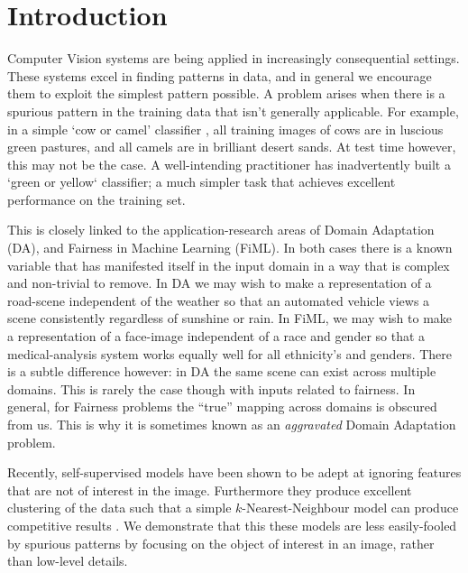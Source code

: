 \documentclass[sigconf,anonymous,review]{acmart}
\begin{document}
\maketitle





\section{Introduction}
\label{sec:intro}
Computer Vision systems are being applied in increasingly consequential settings.
These systems excel in finding patterns in data, and in general we encourage them to exploit the simplest pattern possible.
A problem arises when there is a spurious pattern in the training data that isn't generally applicable.
For example, in a simple `cow or camel' classifier \citep{beery2018recognition}, all training images of cows are in luscious green pastures, and all camels are in brilliant desert sands.
At test time however, this may not be the case. 
A well-intending practitioner has inadvertently built a `green or yellow` classifier; a much simpler task that achieves excellent performance on the training set.

This is closely linked to the application-research areas of Domain Adaptation (DA), and Fairness in Machine Learning (FiML). 
In both cases there is a known variable that has manifested itself in the input domain in a way that is complex and non-trivial to remove.
In DA we may wish to make a representation of a road-scene independent of the weather so that an automated vehicle views a scene consistently regardless of sunshine or rain.
In FiML, we may wish to make a representation of a face-image independent of a race and gender so that a medical-analysis system works equally well for all ethnicity's and genders.
There is a subtle difference however: in DA the same scene can exist across multiple domains.
This is rarely the case though with inputs related to fairness.
In general, for Fairness problems the ``true'' mapping across domains is obscured from us.
This is why it is sometimes known as an \emph{aggravated} Domain Adaptation problem.

Recently, self-supervised models have been shown to be adept at ignoring features that are not of interest in the image.
Furthermore they produce excellent clustering of the data such that a simple $k$-Nearest-Neighbour model can produce competitive results \citep{caron2021emerging}.
We demonstrate that this these models are less easily-fooled by spurious patterns by focusing on the object of interest in an image, rather than low-level details.
\end{document}
